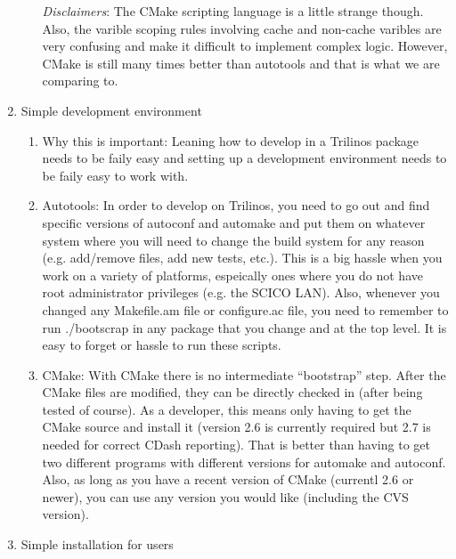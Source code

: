 \documentclass[pdf,ps2pdf,11pt]{SANDreport}
\begin{document}
\begin{enumerate}
\begin{enumerate}
  {}\textit{Disclaimers}: The CMake scripting language is a little
  strange though.  Also, the varible scoping rules involving cache and
  non-cache varibles are very confusing and make it difficult to
  implement complex logic.  However, CMake is still many times better
  than autotools and that is what we are comparing to.

  \end{enumerate}

{}\item Simple development environment

  \begin{enumerate}

  {}\item Why this is important: Leaning how to develop in a Trilinos
  package needs to be faily easy and setting up a development
  environment needs to be faily easy to work with.

  {}\item Autotools: In order to develop on Trilinos, you need to go
  out and find specific versions of autoconf and automake and put them
  on whatever system where you will need to change the build system
  for any reason (e.g. add/remove files, add new tests, etc.).  This
  is a big hassle when you work on a variety of platforms, espeically
  ones where you do not have root administrator privileges (e.g. the
  SCICO LAN).  Also, whenever you changed any Makefile.am file or
  configure.ac file, you need to remember to run ./bootscrap in any
  package that you change and at the top level.  It is easy to forget
  or hassle to run these scripts.

  {}\item CMake: With CMake there is no intermediate ``bootstrap''
  step.  After the CMake files are modified, they can be directly
  checked in (after being tested of course).  As a developer, this
  means only having to get the CMake source and install it (version
  2.6 is currently required but 2.7 is needed for correct CDash
  reporting).  That is better than having to get two different
  programs with different versions for automake and autoconf.  Also,
  as long as you have a recent version of CMake (currentl 2.6 or
  newer), you can use any version you would like (including the CVS
  version).

  \end{enumerate}

{}\item Simple installation for users

  \begin{enumerate}


\end{enumerate}
\end{enumerate}
\end{document}
